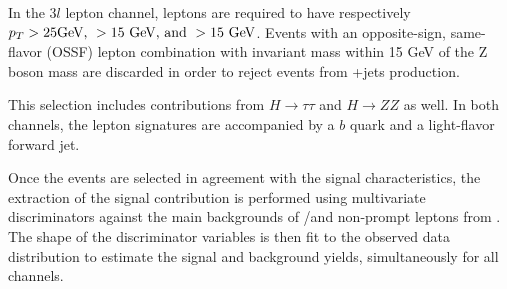 In the $3l$ lepton channel, leptons are required to have respectively $p_T > 25 \textrm{GeV, }> 15\textrm{ GeV, and }> 15\textrm{ GeV}$. Events with an opposite-sign, same-flavor (OSSF) lepton combination with invariant mass within 15 GeV of the Z boson mass are discarded in order to reject events from \WZ +jets production.
























































This selection includes contributions from $H \to \tau\tau$ and $H\to ZZ$ as well. In both channels, the lepton signatures are accompanied by a $b$ quark and a light-flavor forward jet.


Once the events are selected in agreement with the signal characteristics, the extraction of the signal contribution is performed using multivariate discriminators against the main backgrounds of \ttW/\ttZ and non-prompt leptons from \ttbar. The shape of the discriminator variables is then fit to the observed data distribution to estimate the signal and background yields, simultaneously for all channels.











